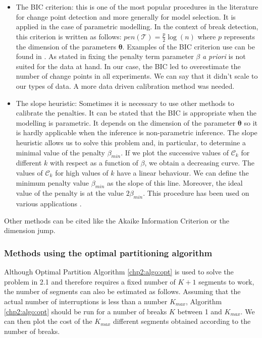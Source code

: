 \begin{itemize}
  \item The BIC criterion: this is one of the most popular procedures in the literature for change point detection and more generally for model selection. It is applied in the case of parametric modelling. In the context of break detection, this criterion is written as follows: $pen(\mathcal{T}) = \frac{p}{2}\log(n)$ where $p$ represents the dimension of the parameters $\bm \theta$. Examples of the BIC criterion use can be found in \cite{YAO1988181,faure2016comparison,Shi2022}. As stated in \cite{faure2016comparison} fixing the penalty term parameter $\beta$ \textit{a priori} is not suited for the data at hand. In our case, the BIC led to overestimate the number of change points in all experiments. We can say that it didn't scale to our types of data. A more data driven calibration method was needed.    
  \item The slope heuristic: Sometimes it is necessary to use other methods to calibrate the penalties. It can be stated that the BIC is appropriate when the modelling is parametric. It depends on the dimension of the parameter $\bm \theta$ so it is hardly applicable when the inference is non-parametric inference. The slope heuristic \cite{Birge2006} allows us to solve this problem and, in particular, to determine a minimal value of the penalty $\beta_{min}$. If we plot the successive values of $\mathcal{C}_k$ for different $k$ with respect as a function of $\beta$, we obtain a decreasing curve. The values of $\mathcal{C}_k$ for high values of $k$ have a linear behaviour. We can define the minimum penalty value $\beta_{min}$ as the slope of this line. Moreover, the ideal value of the penalty is at the value $2\beta_{min}$. This procedure has been used on various applications \cite{Baudry2011,Bardet2012,arlot2009data}.
\end{itemize}

Other methods can be cited like the Akaike Information Criterion or the dimension jump.  

\subsubsection{Methods using the optimal partitioning algorithm}

Although Optimal Partition Algorithm \ref{chp2:algo:opt} is used to solve the problem in 2.1 and therefore requires a fixed number of $K+1$ segments to work, the number of segments can also be estimated as follows. Assuming that the actual number of interruptions is less than a number $K_{max}$, Algorithm \ref{chp2:algo:opt} should be run for a number of breaks $K$ between 1 and $K_{max}$. We can then plot the cost of the $K_{max}$ different segments obtained according to the number of breaks. 

